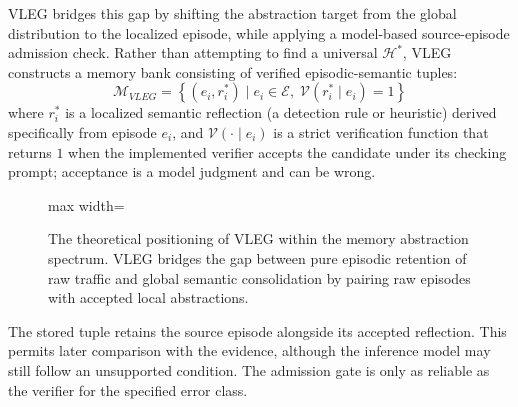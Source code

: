 \documentclass[journal]{IEEEtran}
\theoremstyle{definition}
\theoremstyle{remark}
\begin{document}
VLEG bridges this gap by shifting the abstraction target from the global distribution to the localized episode, while applying a model-based source-episode admission check. Rather than attempting to find a universal $\mathcal{H}^*$, VLEG constructs a memory bank consisting of verified episodic-semantic tuples:
\begin{equation}
    \mathcal{M}_{VLEG} = \left\{ (e_i, r_i^*) \mid e_i \in \mathcal{E}, \; \mathcal{V}(r_i^* \mid e_i) = 1 \right\}
\end{equation}
where $r_i^*$ is a localized semantic reflection (a detection rule or heuristic) derived specifically from episode $e_i$, and $\mathcal{V}(\cdot \mid e_i)$ is a strict verification function that returns $1$ when the implemented verifier accepts the candidate under its checking prompt; acceptance is a model judgment and can be wrong.

\begin{figure}[!t]
\centering
\begin{adjustbox}{max width=\linewidth}\end{adjustbox}
\caption{The theoretical positioning of VLEG within the memory abstraction spectrum. VLEG bridges the gap between pure episodic retention of raw traffic and global semantic consolidation by pairing raw episodes with accepted local abstractions.}
\label{fig:vleg_spectrum}
\end{figure}
The stored tuple retains the source episode alongside its accepted reflection. This permits later comparison with the evidence, although the inference model may still follow an unsupported condition. The admission gate is only as reliable as the verifier for the specified error class.
\end{document}
